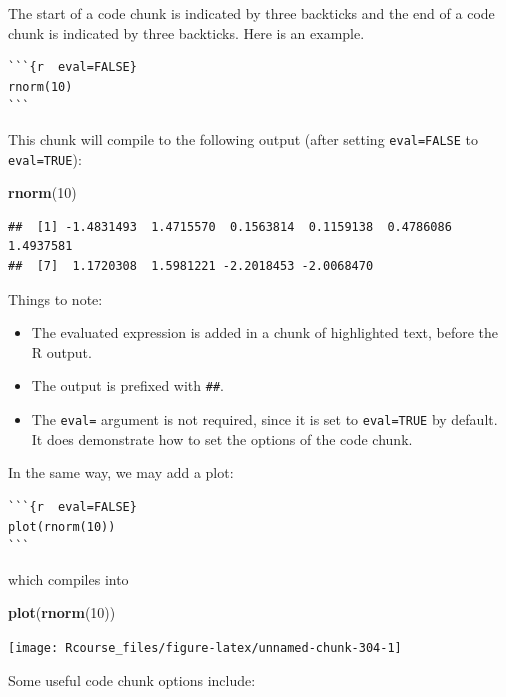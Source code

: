 \documentclass[]{book}
\newenvironment{Shaded}{\begin{snugshade}}{\end{snugshade}}
\newcommand{\DecValTok}[1]{\textcolor[rgb]{0.00,0.00,0.81}{#1}}
\newcommand{\KeywordTok}[1]{\textcolor[rgb]{0.13,0.29,0.53}{\textbf{#1}}}
\newcommand{\NormalTok}[1]{#1}
\providecommand{\tightlist}{%
  \setlength{\itemsep}{0pt}\setlength{\parskip}{0pt}}
\theoremstyle{definition}
\theoremstyle{definition}
\theoremstyle{definition}
\theoremstyle{remark}
\begin{document}
The start of a code chunk is indicated by three backticks and the end of a code chunk is indicated by three backticks.
Here is an example.

\begin{verbatim}
```{r  eval=FALSE}
rnorm(10)
```
\end{verbatim}

This chunk will compile to the following output (after setting \texttt{eval=FALSE} to \texttt{eval=TRUE}):

\begin{Shaded}
\begin{Highlighting}[]
\KeywordTok{rnorm}\NormalTok{(}\DecValTok{10}\NormalTok{)}
\end{Highlighting}
\end{Shaded}

\begin{verbatim}
##  [1] -1.4831493  1.4715570  0.1563814  0.1159138  0.4786086  1.4937581
##  [7]  1.1720308  1.5981221 -2.2018453 -2.0068470
\end{verbatim}

Things to note:

\begin{itemize}
\tightlist
\item
  The evaluated expression is added in a chunk of highlighted text, before the R output.
\item
  The output is prefixed with \texttt{\#\#}.
\item
  The \texttt{eval=} argument is not required, since it is set to \texttt{eval=TRUE} by default. It does demonstrate how to set the options of the code chunk.
\end{itemize}

In the same way, we may add a plot:

\begin{verbatim}
```{r  eval=FALSE}
plot(rnorm(10))
```
\end{verbatim}

which compiles into

\begin{Shaded}
\begin{Highlighting}[]
\KeywordTok{plot}\NormalTok{(}\KeywordTok{rnorm}\NormalTok{(}\DecValTok{10}\NormalTok{))}
\end{Highlighting}
\end{Shaded}

\texttt{[image: Rcourse\_files/figure-latex/unnamed-chunk-304-1]}

Some useful code chunk options include:
\end{document}
